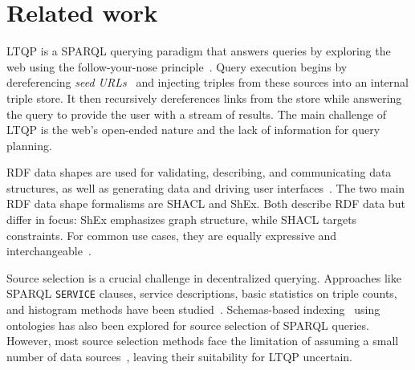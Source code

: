 \section{Related work}


LTQP is a SPARQL querying paradigm that answers queries by exploring the web using the follow-your-nose principle~\cite{hartig2016walking}.
Query execution begins by dereferencing \emph{seed URLs}~\cite{hartig2016walking} and injecting triples from these sources into an internal triple store.
It then recursively dereferences links from the store while answering the query to provide the user with a stream of results.
The main challenge of LTQP is the web's open-ended nature and the lack of information for query planning.

RDF data shapes are used for validating, describing, and communicating data structures, as well as generating data and driving user interfaces~\cite{Gayo2018a,Gayo2018}.
The two main RDF data shape formalisms are SHACL and ShEx.
Both describe RDF data but differ in focus: ShEx emphasizes graph structure, while SHACL targets constraints.
For common use cases, they are equally expressive and interchangeable~\cite{Gayo2018c}.

Source selection is a crucial challenge in decentralized querying.
Approaches like SPARQL \texttt{SERVICE} clauses, service descriptions, basic statistics on triple counts, and histogram methods have been studied~\cite{hose2012towards, Harth2010}.
Schemas-based indexing~\cite{Stuckenschmidt2004} using ontologies has also been explored for source selection of SPARQL queries. 
However, most source selection methods face the limitation of assuming a small number of data sources~\cite{Harth2010}, leaving their suitability for LTQP uncertain.

